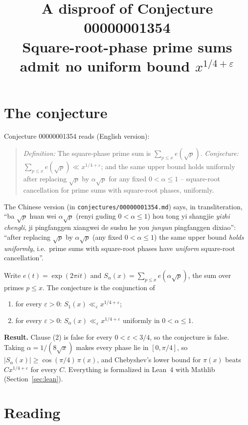 \documentclass[11pt]{article}
\title{A disproof of Conjecture 00000001354\\[2pt]
\large Square-root-phase prime sums admit no uniform bound $x^{1/4+\varepsilon}$}
\date{}
\theoremstyle{definition}
\theoremstyle{remark}
\renewcommand{\_}{\oldus\allowbreak}
\begin{document}
\sloppy
\maketitle

\section{The conjecture}

Conjecture 00000001354 reads (English version):

\begin{quote}
\emph{Definition:} The square-phase prime sum is $\sum_{p\le x} e(\sqrt p)$. \emph{Conjecture:}
$\sum_{p\le x} e(\sqrt p) \ll x^{1/4+\varepsilon}$; and the same upper bound holds uniformly after
replacing $\sqrt p$ by $\alpha\sqrt p$ for any fixed $0<\alpha\le 1$ -- square-root cancellation for
prime sums with square-root phases, uniformly.
\end{quote}

The Chinese version (in \texttt{conjectures/00000001354.md}) says, in transliteration, ``ba $\sqrt p$
huan wei $\alpha\sqrt p$ (renyi guding $0<\alpha\le1$) hou tong yi shangjie \emph{yizhi chengli}, ji
pingfanggen xiangwei de sushu he you \emph{junyun} pingfanggen dixiao'': ``after replacing $\sqrt p$ by
$\alpha\sqrt p$ (any fixed $0<\alpha\le 1$) the same upper bound \emph{holds uniformly}, i.e.\ prime sums
with square-root phases have \emph{uniform} square-root cancellation''.

Write $e(t) = \exp(2\pi i t)$ and $S_\alpha(x) = \sum_{p\le x} e(\alpha\sqrt p)$, the sum over primes
$p \le x$. The conjecture is the conjunction of
\begin{enumerate}[label=(\arabic*)]
\item for every $\varepsilon>0$: $S_1(x) \ll_\varepsilon x^{1/4+\varepsilon}$;
\item for every $\varepsilon>0$: $S_\alpha(x) \ll_\varepsilon x^{1/4+\varepsilon}$ uniformly in
  $0<\alpha\le1$.
\end{enumerate}

\textbf{Result.} Clause (2) is false for every $0<\varepsilon<3/4$, so the conjecture is false. Taking
$\alpha = 1/(8\sqrt x)$ makes every phase lie in $[0,\pi/4]$, so $|S_\alpha(x)| \ge \cos(\pi/4)\,\pi(x)$,
and Chebyshev's lower bound for $\pi(x)$ beats $C x^{1/4+\varepsilon}$ for every $C$. Everything is
formalized in Lean~4 with Mathlib (Section~\ref{sec:lean}).

\section{Reading}\label{sec:reading}
\end{document}
